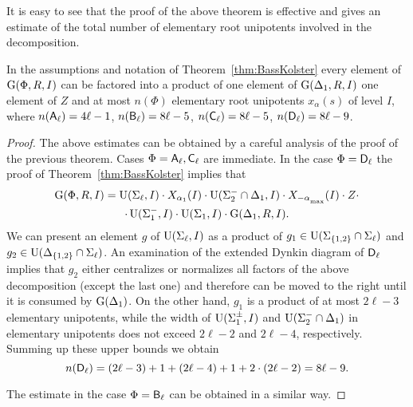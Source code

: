 It is easy to see that the proof of the above theorem is effective and gives an estimate of the total number of elementary root unipotents involved in the decomposition.
\begin{cor}
In the assumptions and notation of Theorem~\ref{thm:BassKolster} every element of $\operatorname{G}(\Phi,R,I)$ 
can be factored into a product of one element of $\operatorname{G}(\Delta_1,R,I)$ one element of $Z$ and at most $n(\Phi)$ elementary root unipotents $x_\alpha(s)$ of level $I$, where
$n(\mathsf{A}_\ell)= 4 \ell - 1$, $n(\mathsf{B}_\ell)= 8 \ell - 5$, $n(\mathsf{C}_\ell)= 8 \ell - 5$, $n(\mathsf{D}_\ell)= 8 \ell - 9$. \end{cor}
\begin{proof}
The above estimates can be obtained by a careful analysis of the proof of the previous theorem.
Cases $\Phi=\mathsf{A}_\ell, \mathsf{C}_\ell$ are immediate.
In the case $\Phi=\mathsf{D}_\ell$ the proof of Theorem~\ref{thm:BassKolster} implies that
\begin{multline}\nonumber
\G(\Phi,R,I) =  \U(\Sigma_\ell,I) \cdot X_{\alpha_1}(I) \cdot \U(\Sigma_2^-\cap\Delta_1,I) \cdot X_{-\alpha\ssub{\mathrm{max}}}(I) \cdot Z  \cdot \\ \cdot \U(\Sigma_1^-,I) \cdot \U(\Sigma_1,I) \cdot \G(\Delta_1,R,I).
\end{multline}
We can present an element $g$ of $\operatorname{U}(\Sigma_\ell, I)$ as a product of $g_1 \in \operatorname{U}(\Sigma_{\{1,2\}} \cap \Sigma_\ell)$ and $g_2\in \operatorname{U}(\Delta_{\{1,2\}}\cap \Sigma_\ell)$.
An examination of the extended Dynkin diagram of $\mathsf{D}_\ell$ implies that $g_2$ either centralizes or normalizes all factors of the above decomposition (except the last one) and therefore can be moved to the right until it is consumed by $\operatorname{G}(\Delta_1)$.
On the other hand, $g_1$ is a product of at most $2\ell-3$ elementary unipotents, while the width of $\operatorname{U}(\Sigma_1^\pm, I)$ and $\operatorname{U}(\Sigma_2^-\cap\Delta_1)$ in elementary unipotents does not exceed $2\ell-2$ and $2\ell-4$, respectively.
Summing up these upper bounds we obtain
$$n(\mathsf{D}_\ell) = (2\ell-3) + 1 + (2\ell - 4) + 1 + 2\cdot (2\ell - 2) = 8\ell - 9.$$

The estimate in the case $\Phi=\mathsf{B}_\ell$ can be obtained in a similar way. \end{proof}